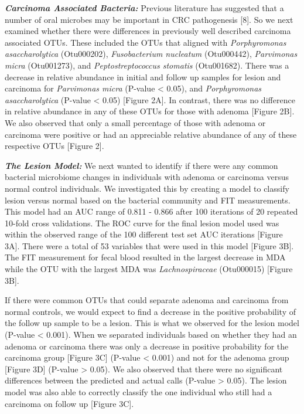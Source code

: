 \documentclass[12pt,]{article}
\begin{document}
\textbf{\emph{Carcinoma Associated Bacteria:}} Previous literature has
suggested that a number of oral microbes may be important in CRC
pathogenesis {[}8{]}. So we next examined whether there were differences
in previously well described carcinoma associated OTUs. These included
the OTUs that aligned with \emph{Porphyromonas asaccharolytica}
(Otu000202), \emph{Fusobacterium nucleatum} (Otu000442),
\emph{Parvimonas micra} (Otu001273), and \emph{Peptostreptococcus
stomatis} (Otu001682). There was a decrease in relative abundance in
initial and follow up samples for lesion and carcinoma for
\emph{Parvimonas micra} (P-value \textless{} 0.05), and
\emph{Porphyromonas asaccharolytica} (P-value \textless{} 0.05)
{[}Figure 2A{]}. In contrast, there was no difference in relative
abundance in any of these OTUs for those with adenoma {[}Figure 2B{]}.
We also observed that only a small percentage of those with adenoma or
carcinoma were positive or had an appreciable relative abundance of any
of these respective OTUs {[}Figure 2{]}.

\textbf{\emph{The Lesion Model:}} We next wanted to identify if there
were any common bacterial microbiome changes in individuals with adenoma
or carcinoma versus normal control individuals. We investigated this by
creating a model to classify lesion versus normal based on the bacterial
community and FIT measurements. This model had an AUC range of 0.811 -
0.866 after 100 iterations of 20 repeated 10-fold cross validations. The
ROC curve for the final lesion model used was within the observed range
of the 100 different test set AUC iterations {[}Figure 3A{]}. There were
a total of 53 variables that were used in this model {[}Figure 3B{]}.
The FIT measurement for fecal blood resulted in the largest decrease in
MDA while the OTU with the largest MDA was \emph{Lachnospiraceae}
(Otu000015) {[}Figure 3B{]}.

If there were common OTUs that could separate adenoma and carcinoma from
normal controls, we would expect to find a decrease in the positive
probability of the follow up sample to be a lesion. This is what we
observed for the lesion model (P-value \textless{} 0.001). When we
separated individuals based on whether they had an adenoma or carcinoma
there was only a decrease in positive probability for the carcinoma
group {[}Figure 3C{]} (P-value \textless{} 0.001) and not for the
adenoma group {[}Figure 3D{]} (P-value \textgreater{} 0.05). We also
observed that there were no significant differences between the
predicted and actual calls (P-value \textgreater{} 0.05). The lesion
model was also able to correctly classify the one individual who still
had a carcinoma on follow up {[}Figure 3C{]}.
\end{document}
